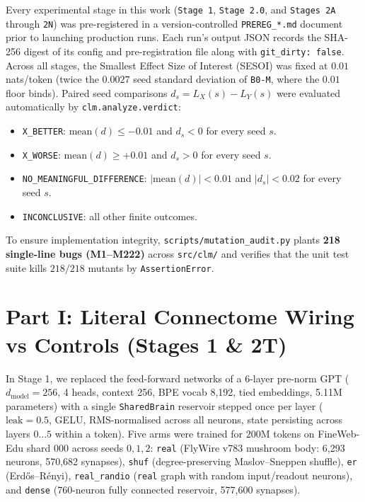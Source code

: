 \documentclass[11pt,a4paper]{article}
\begin{document}
Every experimental stage in this work (\texttt{Stage 1}, \texttt{Stage 2.0}, and \texttt{Stages 2A} through \texttt{2N}) was pre-registered in a version-controlled \texttt{PREREG\_*.md} document prior to launching production runs. Each run's output JSON records the SHA-256 digest of its config and pre-registration file along with \texttt{git\_dirty: false}. Across all stages, the Smallest Effect Size of Interest (SESOI) was fixed at $0.01$ nats/token (twice the $0.0027$ seed standard deviation of \texttt{B0-M}, where the $0.01$ floor binds). Paired seed comparisons $d_s = L_X(s) - L_Y(s)$ were evaluated automatically by \texttt{clm.analyze.verdict}:
\begin{itemize}
    \item \texttt{X\_BETTER}: $\text{mean}(d) \le -0.01$ and $d_s < 0$ for every seed $s$.
    \item \texttt{X\_WORSE}: $\text{mean}(d) \ge +0.01$ and $d_s > 0$ for every seed $s$.
    \item \texttt{NO\_MEANINGFUL\_DIFFERENCE}: $|\text{mean}(d)| < 0.01$ and $|d_s| < 0.02$ for every seed $s$.
    \item \texttt{INCONCLUSIVE}: all other finite outcomes.
\end{itemize}
To ensure implementation integrity, \texttt{scripts/mutation\_audit.py} plants \textbf{218 single-line bugs (M1--M222)} across \texttt{src/clm/} and verifies that the unit test suite kills $218/218$ mutants by \texttt{AssertionError}.

\section{Part I: Literal Connectome Wiring vs Controls (Stages 1 \& 2T)}

In Stage 1, we replaced the feed-forward networks of a 6-layer pre-norm GPT ($d_{\text{model}}=256$, 4 heads, context 256, BPE vocab 8,192, tied embeddings, 5.11M parameters) with a single \texttt{SharedBrain} reservoir stepped once per layer ($\text{leak}=0.5$, GELU, RMS-normalised across all neurons, state persisting across layers $0\dots 5$ within a token). Five arms were trained for $200\text{M}$ tokens on FineWeb-Edu shard 000 across seeds $0, 1, 2$: \texttt{real} (FlyWire v783 mushroom body: 6,293 neurons, 570,682 synapses), \texttt{shuf} (degree-preserving Maslov--Sneppen shuffle), \texttt{er} (Erd\H{o}s--R\'enyi), \texttt{real\_randio} (\texttt{real} graph with random input/readout neurons), and \texttt{dense} (760-neuron fully connected reservoir, 577,600 synapses).
\end{document}
